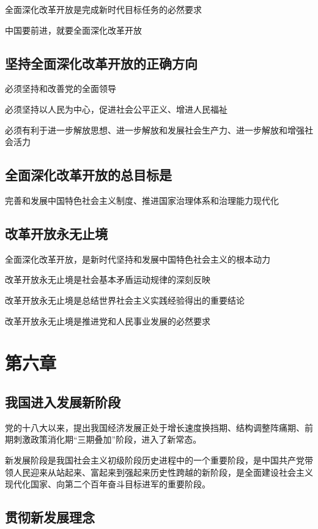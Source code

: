 \documentclass[11pt, a4paper]{article}
\begin{document}
全面深化改革开放是完成新时代目标任务的必然要求

中国要前进，就要全面深化改革开放

\subsection*{坚持全面深化改革开放的正确方向}

必须坚持和改善党的全面领导

必须坚持以人民为中心，促进社会公平正义、增进人民福祉

必须有利于进一步解放思想、进一步解放和发展社会生产力、进一步解放和增强社会活力

\subsection*{全面深化改革开放的总目标是}

完善和发展中国特色社会主义制度、推进国家治理体系和治理能力现代化

\subsection*{改革开放永无止境}

全面深化改革开放，是新时代坚持和发展中国特色社会主义的根本动力

改革开放永无止境是社会基本矛盾运动规律的深刻反映

改革开放永无止境是总结世界社会主义实践经验得出的重要结论

改革开放永无止境是推进党和人民事业发展的必然要求

\section*{第六章}

\subsection*{我国进入发展新阶段}

党的十八大以来，提出我国经济发展正处于增长速度换挡期、结构调整阵痛期、前期刺激政策消化期“三期叠加”阶段，进入了新常态。

新发展阶段是我国社会主义初级阶段历史进程中的一个重要阶段，是中国共产党带领人民迎来从站起来、富起来到强起来历史性跨越的新阶段，是全面建设社会主义现代化国家、向第二个百年奋斗目标进军的重要阶段。

\subsection*{贯彻新发展理念}
\end{document}

